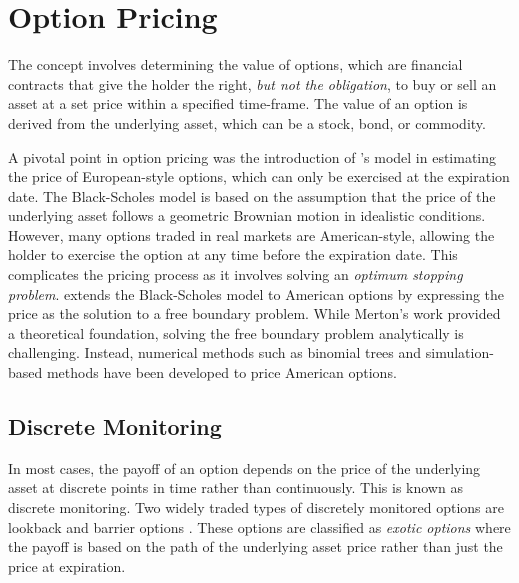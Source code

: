 \documentclass[a4paper]{report}
\begin{document}
\section{Option Pricing}\label{section:option_pricing}
The concept involves determining the value of options, which are financial contracts that give the holder the right, \textit{but not the obligation}, to buy or sell an asset at a set price within a specified time-frame. The value of an option is derived from the underlying asset, which can be a stock, bond, or commodity. 

A pivotal point in option pricing was the introduction of \citet{black1973pricing}'s model in estimating the price of European-style options, which can only be exercised at the expiration date. The Black-Scholes model is based on the assumption that the price of the underlying asset follows a geometric Brownian motion in idealistic conditions. However, many options traded in real markets are American-style, allowing the holder to exercise the option at any time before the expiration date. This complicates the pricing process as it involves solving an \textit{optimum stopping problem}. \citet{merton1973theory} extends the Black-Scholes model to American options by expressing the price as the solution to a free boundary problem. While Merton's work provided a theoretical foundation, solving the free boundary problem analytically is challenging. Instead, numerical methods such as binomial trees \citep{cox1979option} and simulation-based methods \citep{longstaff2001simulation} have been developed to price American options.

\subsection{Discrete Monitoring}\label{section:discrete_monitoring}
In most cases, the payoff of an option depends on the price of the underlying asset at discrete points in time rather than continuously. This is known as discrete monitoring. Two widely traded types of discretely monitored options are lookback and barrier options \citep{dadachanji2015fx}. These options are classified as \textit{exotic options} where the payoff is based on the path of the underlying asset price rather than just the price at expiration.
\end{document}

